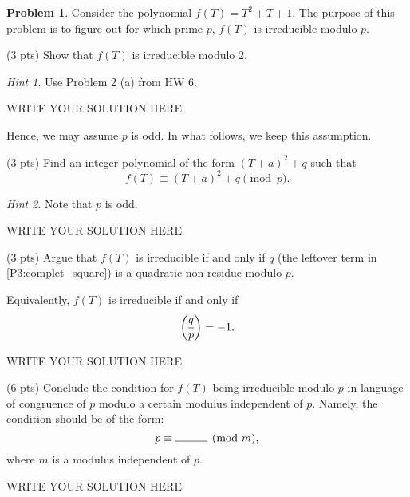 \documentclass[11pt]{article}
\theoremstyle{plain}
\theoremstyle{definition}
\newtheorem{problem}{Problem}
\theoremstyle{remark}
\newtheorem*{hint}{Hint}
\numberwithin{equation}{problem}
\newcommand{\genlegendre}[4]{%
  \genfrac{(}{)}{}{#1}{#3}{#4}%
  \if\relax\detokenize{#2}\relax\else_{\!#2}\fi
}
\newcommand{\dlegendre}[3][]{\genlegendre{0}{#1}{#2}{#3}}
\begin{document}
\begin{problem}
	Consider the polynomial $f(T)=T^2+T+1$. 
	The purpose of this problem is to figure out for which prime $p$, $f(T)$ is irreducible modulo $p$.
	\begin{listinprob}
	\item (3 pts) Show that $f(T)$ is irreducible modulo $2$.
	\begin{hint}
		Use Problem 2 (a) from HW 6.
	\end{hint}	
	\end{listinprob}
\begin{solution} %
WRITE YOUR SOLUTION HERE
\end{solution}\clearpage %

	
	Hence, we may assume $p$ is odd. In what follows, we keep this assumption.
	\begin{listinprob}[resume]
	\item\label{P3:complet_square} (3 pts) Find an integer polynomial of the form $(T+a)^2+q$ such that 
	\[
		f(T) \equiv (T+a)^2+q \pmod{p}.
	\]
	\begin{hint}
		Note that $p$ is odd.
	\end{hint}	
\begin{solution} %
WRITE YOUR SOLUTION HERE
\end{solution}\clearpage %

	
	\item (3 pts) Argue that $f(T)$ is irreducible if and only if $q$ (the leftover term in \ref{P3:complet_square}) is a quadratic non-residue modulo $p$.
	\end{listinprob}
	Equivalently, $f(T)$ is irreducible if and only if 
	\[
		\dlegendre{q}{p} = -1.
	\]
\begin{solution} %
WRITE YOUR SOLUTION HERE
\end{solution}\clearpage %


	\begin{listinprob}[resume]
	\item (6 pts) Conclude the condition for $f(T)$ being irreducible modulo $p$ in language of congruence of $p$ modulo a certain modulus independent of $p$. Namely, the condition should be of the form:
	\[
		p\equiv \rule{1cm}{0.15mm} \pmod{m},
	\]
	where $m$ is a modulus independent of $p$. 
	\end{listinprob} 
\end{problem}
\begin{solution} %
WRITE YOUR SOLUTION HERE
\end{solution}\clearpage %
\end{document}

